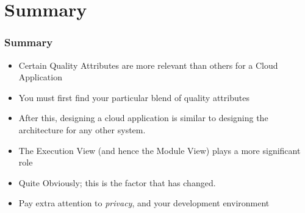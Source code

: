 \documentclass[10pt]{beamer}
\def\subitem{\item[\hspace{1.5cm} -]}
\begin{document}
\section{Summary}
\begin{frame}[t]
\frametitle{Summary}
\begin{itemize}
\item Certain Quality Attributes are more relevant than others for a Cloud Application
\item You must first find your particular blend of quality attributes
\item After this, designing a cloud application is similar to designing the architecture for any other system.
\item The Execution View (and hence the Module View) plays a more significant role
\subitem Quite Obviously; this is the factor that has changed.
\item Pay extra attention to \emph{privacy}, and your development environment
\end{itemize}
\end{frame}




%    
%    

%     

\end{document}
